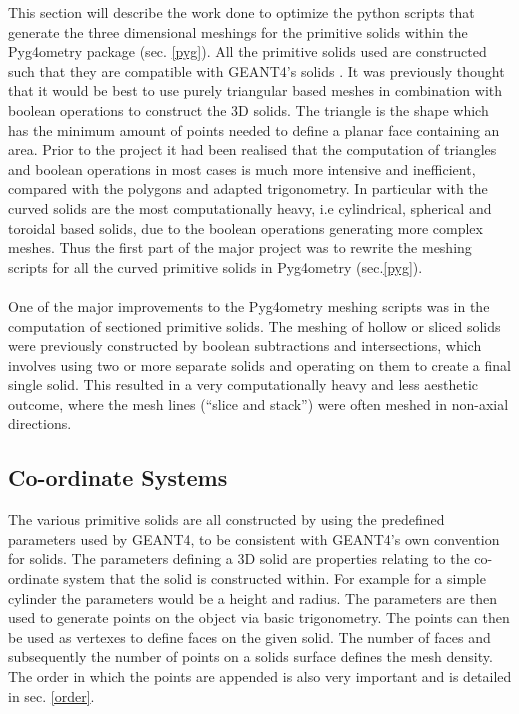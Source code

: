 \documentclass[12pt,a4paper]{article}
\begin{document}
This section will describe the work done to optimize the python scripts that generate the three dimensional meshings for the primitive solids within the Pyg4ometry package (sec. \ref{pyg}). All the primitive solids used are constructed such that they are compatible with GEANT4's solids \cite{solids}. It was previously thought that it would be best to use purely triangular based meshes in combination with boolean operations to construct the 3D solids. The triangle is the shape which has the minimum amount of points needed to define a planar face containing an area. Prior to the project it had been realised that the computation of triangles and boolean operations in most cases is much more intensive and inefficient, compared with the polygons and adapted trigonometry. In particular with the curved solids are the most computationally heavy, i.e cylindrical, spherical and toroidal based solids, due to the boolean operations generating more complex meshes. Thus the first part of the major project was to rewrite the meshing scripts for all the curved primitive solids in Pyg4ometry (sec.\ref{pyg}).
\\\\
One of the major improvements to the Pyg4ometry meshing scripts was in the computation of sectioned primitive solids. The meshing of hollow or sliced solids were previously constructed by boolean subtractions and intersections, which involves using two or more separate solids and operating on them to create a final single solid. This resulted in a very computationally heavy and less aesthetic outcome, where the mesh lines (``slice and stack'') were often meshed in non-axial directions.

\subsection{Co-ordinate Systems}
\label{cosy}
The various primitive solids are all constructed by using the predefined parameters used by GEANT4, to be consistent with GEANT4's own convention for solids. The parameters defining a 3D solid are properties relating to the co-ordinate system that the solid is constructed within. For example for a simple cylinder the parameters would be a height and radius. The parameters are then used to generate points on the object via basic trigonometry. The points can then be used as vertexes to define faces on the given solid. The number of faces and subsequently the number of points on a solids surface defines the mesh density. The order in which the points are appended is also very important and is detailed in sec. \ref{order}.
\\\\
\end{document}
